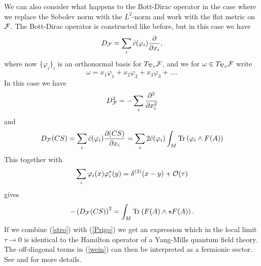 \documentclass[letterpaper,11pt]{article}
\def\d{\delta}
\def\cf{{\cal F}}
\def\co{{\cal O}}
\newcommand{\pa}{\partial}
\begin{document}
We can also consider what happens to the Bott-Dirac operator in the case where we replace the Sobolev norm with the $L^2$-norm and work with the flat metric on $\cf$. The Bott-Dirac operator is constructed like before, but in this case we have
\begin{equation}
D_\cf =\sum_i \bar{c}(\varphi_i ) \frac{\partial }{\pa x_i } ,
\label{stro}
\end{equation}
where now $\{\varphi_i\}_{i}$ is an orthonormal basis for $T_{\nabla_0} \cf $, and we for $\omega \in T_{\nabla_0} \cf $ write 
$$\omega=x_1\varphi_1+x_2\varphi_2+x_3\varphi_3+\ldots  .$$
In this case we have 
$$D_\cf^2 =-\sum_i \frac{\pa^2}{\pa x_i^2}   $$
and 
\begin{equation}
D_\cf (CS)= \sum_i \bar{c}(\varphi_i) \frac{\pa (CS)}{\pa x_i}= \sum_i  2 \bar{c}(\varphi_i)  \int_M \mbox{Tr}\left(\varphi_i\wedge F(A)  \right)
\label{wein2}
\end{equation}
This together with
$$
\sum_i \varphi_i(x)\varphi_i^*(y) = \d^{(3)}(x-y) + \co(\tau)
$$
gives 
\begin{equation}
 - \left(D_\cf(CS)\right)^2  = \int_M \mbox{Tr}\left( F(A)\wedge \star F(A)\right) .
\label{Prigo}
\end{equation}
If we combine (\ref{stro}) with (\ref{Prigo}) we get an expression which in the local limit $\tau\rightarrow 0$ is identical to the Hamilton operator of a Yang-Mills quantum field theory. The off-diagonal terms in (\ref{wein}) can then be interpreted as a fermionic sector. See \cite{Aastrup:2020jcf} and \cite{Aastrup:2017atr} for more details.
\end{document}
